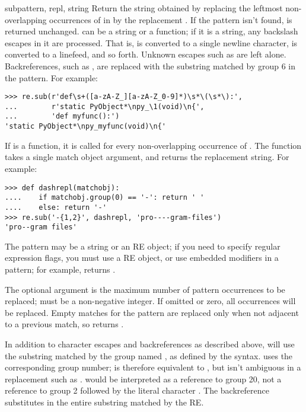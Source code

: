 \begin{funcdesc}{sub}{pattern, repl, string}
  Return the string obtained by replacing the leftmost non-overlapping
  occurrences of  in  by the replacement
  .  If the pattern isn't found,  is returned
  unchanged.   can be a string or a function; if it is a
  string, any backslash escapes in it are processed.  That is,
   is converted to a single newline character, 
  is converted to a linefeed, and so forth.  Unknown escapes such as
   are left alone.  Backreferences, such as , are
  replaced with the substring matched by group 6 in the pattern.  For
  example:

\begin{verbatim}
>>> re.sub(r'def\s+([a-zA-Z_][a-zA-Z_0-9]*)\s*\(\s*\):',
...        r'static PyObject*\npy_\1(void)\n{',
...        'def myfunc():')
'static PyObject*\npy_myfunc(void)\n{'
\end{verbatim}

  If  is a function, it is called for every non-overlapping
  occurrence of .  The function takes a single match
  object argument, and returns the replacement string.  For example:

\begin{verbatim}
>>> def dashrepl(matchobj):
....    if matchobj.group(0) == '-': return ' '
....    else: return '-'
>>> re.sub('-{1,2}', dashrepl, 'pro----gram-files')
'pro--gram files'
\end{verbatim}

  The pattern may be a string or an RE object; if you need to specify
  regular expression flags, you must use a RE object, or use embedded
  modifiers in a pattern; for example,  returns .

  The optional argument  is the maximum number of pattern
  occurrences to be replaced;  must be a non-negative
  integer.  If omitted or zero, all occurrences will be replaced.
  Empty matches for the pattern are replaced only when not adjacent to
  a previous match, so  returns
  .

  In addition to character escapes and backreferences as described
  above,  will use the substring matched by the group
  named , as defined by the  syntax.
   uses the corresponding group number;
   is therefore equivalent to , but isn't
  ambiguous in a replacement such as .  
  would be interpreted as a reference to group 20, not a reference to
  group 2 followed by the literal character .  The
  backreference  substitutes in the entire substring
  matched by the RE.
\end{funcdesc}

